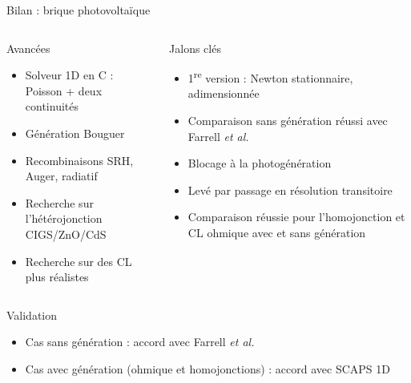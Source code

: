 
\begin{frame}[t]{Bilan : brique photovoltaïque}
  \vspace{0.3em}
  \begin{columns}[T,onlytextwidth]
      \begin{pcbanner}{Avancées}
        \begin{itemize}\footnotesize
          \item Solveur 1D en C : Poisson + deux continuités
          \item Génération Bouguer
          \item Recombinaisons SRH, Auger, radiatif
          \item Recherche sur l'hétérojonction CIGS/ZnO/CdS
          \item Recherche sur des CL plus réalistes
        \end{itemize}
      \end{pcbanner}
      \begin{pcbanner}{Jalons clés}
        \begin{itemize}\footnotesize
          \item 1\textsuperscript{re} version : Newton stationnaire, adimensionnée
          \item Comparaison sans génération réussi avec Farrell \textit{et al.}
          \item Blocage à la photogénération
          \item Levé par passage en résolution transitoire
          \item Comparaison réussie pour l'homojonction et CL ohmique avec et sans génération
        \end{itemize}
      \end{pcbanner}
  \end{columns}

  \vspace{0.3em}
  \begin{columns}[T,onlytextwidth]
    \column{\textwidth}
      \begin{pcbanner}{Validation}
        \begin{itemize}\footnotesize
          \item Cas sans génération : accord avec Farrell \textit{et al.}
          \item Cas avec génération (ohmique et homojonctions) : accord avec SCAPS 1D 
        \end{itemize}
      \end{pcbanner}
  \end{columns}
\end{frame}

